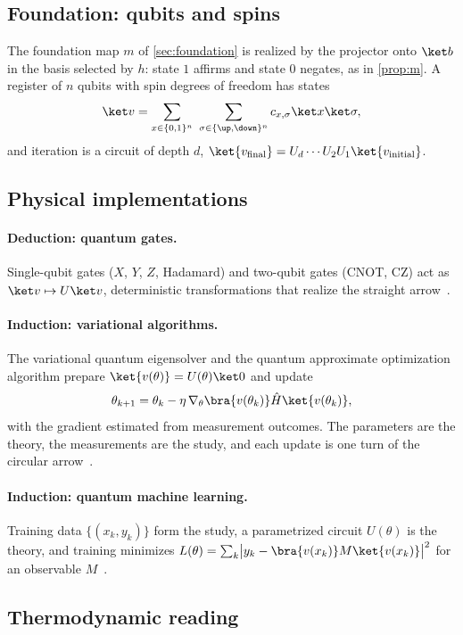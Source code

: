 \subsection{Foundation: qubits and spins}

The foundation map $m$ of \cref{sec:foundation} is realized by the projector onto $\ket b$ in the
basis selected by $h$: state $1$ affirms and state $0$ negates, as in \cref{prop:m}. A register of
$n$ qubits with spin degrees of freedom has states
\[
  \ket v=\sum_{x\in\{0,1\}^n}\ \sum_{\sigma\in\{\up,\down\}^n} c_{x,\sigma}\ket x\ket\sigma ,
\]
and iteration is a circuit of depth $d$, $\ket{v_{\mathrm{final}}}=U_d\cdots U_2U_1\ket{v_{\mathrm{initial}}}$.

\subsection{Physical implementations}

\paragraph{Deduction: quantum gates.} Single-qubit gates ($X$, $Y$, $Z$, Hadamard) and two-qubit
gates (CNOT, CZ) act as $\ket v\mapsto U\ket v$, deterministic transformations that realize the
straight arrow~\cite{nielsen,deutsch}.

\paragraph{Induction: variational algorithms.} The variational quantum eigensolver and the quantum
approximate optimization algorithm prepare $\ket{v(\theta)}=U(\theta)\ket0$ and update
\[
  \theta_{k+1}=\theta_k-\eta\,\nabla_\theta\bra{v(\theta_k)}\hat H\ket{v(\theta_k)},
\]
with the gradient estimated from measurement outcomes. The parameters are the theory, the
measurements are the study, and each update is one turn of the circular arrow~\cite{preskill}.

\paragraph{Induction: quantum machine learning.} Training data $\{(x_k,y_k)\}$ form the study, a
parametrized circuit $U(\theta)$ is the theory, and training minimizes
$L(\theta)=\sum_k\bigl|y_k-\bra{v(x_k)}M\ket{v(x_k)}\bigr|^2$ for an observable
$M$~\cite{biamonte}.

\subsection{Thermodynamic reading}

